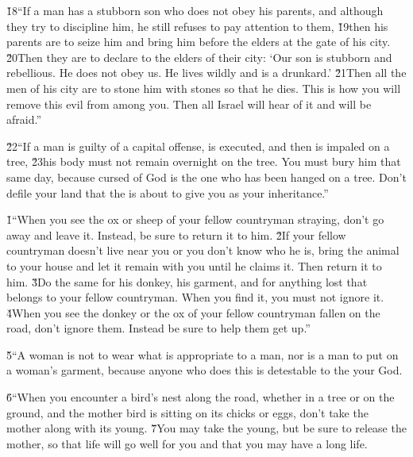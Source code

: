 \v{18}``If a man has a stubborn son who does not obey his parents, and although they try to discipline him, he still refuses to pay attention to them, \v{19}then his parents are to seize him and bring him before the elders at the gate of his city. \v{20}Then they are to declare to the elders of their city: `Our son is stubborn and rebellious. He does not obey us. He lives wildly and is a drunkard.' \v{21}Then all the men of his city are to stone him with stones so that he dies. This is how you will remove this evil from among you. Then all Israel will hear of it and will be afraid.''

\v{22}``If a man is guilty of a capital offense, is executed, and then is impaled on a tree, \v{23}his body must not remain overnight on the tree. You must bury him that same day, because cursed of God is the one who has been hanged on a tree. Don't defile your land that the  is about to give you as your inheritance.''

\v{1}``When you see the ox or sheep of your fellow countryman straying, don't go away and leave it. Instead, be sure to return it to him. \v{2}If your fellow countryman doesn't live near you or you don't know who he is, bring the animal to your house and let it remain with you until he claims it. Then return it to him. \v{3}Do the same for his donkey, his garment, and for anything lost that belongs to your fellow countryman. When you find it, you must not ignore it. \v{4}When you see the donkey or the ox of your fellow countryman fallen on the road, don't ignore them. Instead be sure to help them get up.''

\v{5}``A woman is not to wear what is appropriate to a man, nor is a man to put on a woman's garment, because anyone who does this is detestable to the  your God.

\v{6}``When you encounter a bird's nest along the road, whether in a tree or on the ground, and the mother bird is sitting on its chicks or eggs, don't take the mother along with its young. \v{7}You may take the young, but be sure to release the mother, so that life will go well for you and that you may have a long life.

